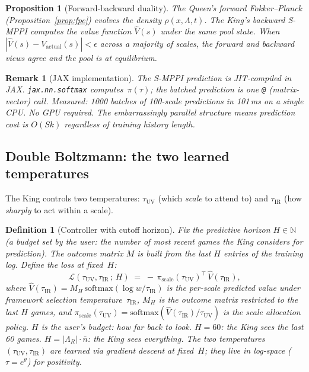 \documentclass[11pt,a4paper]{article}
\newtheorem{proposition}[theorem]{Proposition}
\newtheorem{definition}[theorem]{Definition}
\newtheorem{remark}[theorem]{Remark}
\newcommand{\N}{\mathbb{N}}
\newcommand{\cL}{\mathcal{L}}
\newcommand{\softmax}{\mathrm{softmax}}
\begin{document}
\begin{proposition}[Forward-backward duality]\label{prop:duality}
The Queen's forward Fokker--Planck
(Proposition~\ref{prop:fpe}) evolves the density
$\rho(x,\Lambda,t)$.
The King's backward S-MPPI computes the value function
$\hat{V}(s)$ under the \emph{same} pool state.
When $|\hat{V}(s) - V_{\text{actual}}(s)| < \epsilon$
across a majority of scales, the forward and backward
views agree and the pool is at equilibrium.
\end{proposition}

\begin{remark}[JAX implementation]\label{rem:jax}
The S-MPPI prediction is JIT-compiled in JAX\@.
\texttt{jax.nn.softmax} computes~$\pi(\tau)$;
the batched prediction is one \texttt{@} (matrix-vector)
call.
Measured: 1000 batches of 100-scale predictions in 101\,ms
on a single CPU\@.
No GPU required.
The embarrassingly parallel structure means prediction
cost is $O(Sk)$ regardless of training history length.
\end{remark}

\subsection{Double Boltzmann: the two learned temperatures}%
\label{sec:double-boltzmann}

The King controls two temperatures:
$\tau_{\mathrm{UV}}$ (which \emph{scale} to attend to)
and $\tau_{\mathrm{IR}}$ (how \emph{sharply} to act within
a scale).

\begin{definition}[Controller with cutoff horizon]\label{def:two-temp}
Fix the \emph{predictive horizon} $H \in \N$
(a budget set by the user: the number of most recent
games the King considers for prediction).
The outcome matrix $M$ is built from the last $H$
entries of the training log.
Define the loss at fixed~$H$:
\begin{equation}\label{eq:controller-loss}
  \cL(\tau_{\mathrm{UV}}, \tau_{\mathrm{IR}} \,;\, H)
    \;=\; -\,\pi_{\mathrm{scale}}(\tau_{\mathrm{UV}})^\top\,
           \hat{V}(\tau_{\mathrm{IR}}),
\end{equation}
where
$\hat{V}(\tau_{\mathrm{IR}}) = M_H \,\softmax(\log w / \tau_{\mathrm{IR}})$
is the per-scale predicted value under framework selection
temperature~$\tau_{\mathrm{IR}}$,
$M_H$ is the outcome matrix restricted to the last $H$ games,
and
$\pi_{\mathrm{scale}}(\tau_{\mathrm{UV}})
  = \softmax(\hat{V}(\tau_{\mathrm{IR}}) / \tau_{\mathrm{UV}})$
is the scale allocation policy.
$H$ is the user's budget: how far back to look.
$H = 60$: the King sees the last 60 games.
$H = |\Lambda_R| \cdot \bar{n}$: the King sees everything.
The two temperatures $(\tau_{\mathrm{UV}}, \tau_{\mathrm{IR}})$
are learned via gradient descent at fixed~$H$;
they live in log-space ($\tau = e^\theta$) for positivity.
\end{definition}
\end{document}
